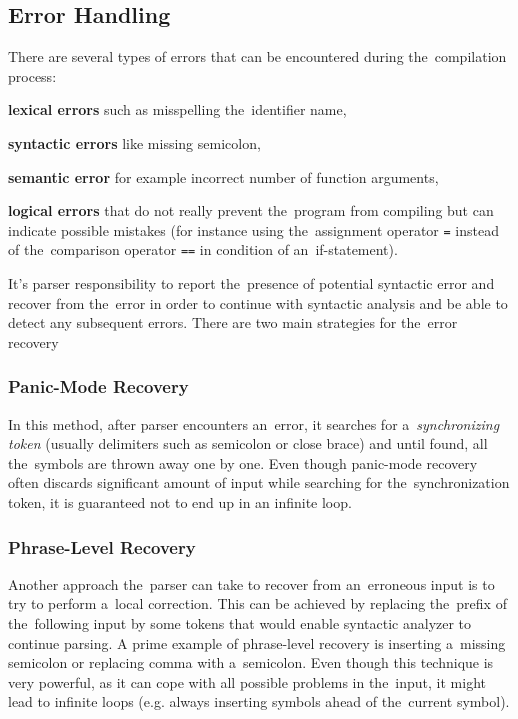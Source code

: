 \documentclass[
  digital, %
  table,   %
  lof,     %
  lot,     %
  oneside,
]{fithesis3}
\begin{document}
  \subsection{Error Handling}
There are several types of errors that can be encountered during the~compilation process:
\begin{compactitem}
  \item\textbf{lexical errors} such as misspelling the~identifier name,
  \item\textbf{syntactic errors} like missing semicolon,
  \item\textbf{semantic error} for example incorrect number of function arguments,
  \item\textbf{logical errors} that do not really prevent the~program from compiling but can indicate possible mistakes (for instance using the~assignment operator \texttt{=} instead of the~comparison operator \texttt{==} in condition of an~if-statement).
\end{compactitem} 

It's parser responsibility to report the~presence of potential syntactic error and recover from the~error in order to continue with syntactic analysis and be able to detect any subsequent errors. There are two main strategies for the~error recovery~\cite{dragon-book}

  \subsubsection{Panic-Mode Recovery}
In this method, after parser encounters an~error, it searches for a~\textit{synchronizing token} (usually delimiters such as semicolon or close brace) and until found, all the~symbols are thrown away one by one. Even though panic-mode recovery often discards significant amount of input while searching for the~synchronization token, it is guaranteed not to end up in an infinite loop.

  \subsubsection{Phrase-Level Recovery}
Another approach the~parser can take to recover from an~erroneous input is to try to perform a~local correction. This can be achieved by replacing the~prefix of the~following input by some tokens that would enable syntactic analyzer to continue parsing. A prime example of phrase-level recovery is inserting a~missing semicolon or replacing comma with a~semicolon. Even though this technique is very powerful, as it can cope with all possible problems in the~input, it might lead to infinite loops (e.g. always inserting symbols ahead of the~current symbol).
\end{document}
